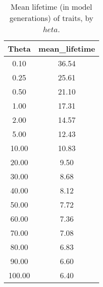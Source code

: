 \begin{table}[ht]
\begin{ruledtabular}
\begin{tabular}{|c|c|}
  \hline
Theta & mean\_lifetime \\ 
  \hline
0.10 & 36.54 \\ 
  0.25 & 25.61 \\ 
  0.50 & 21.10 \\ 
  1.00 & 17.31 \\ 
  2.00 & 14.57 \\ 
  5.00 & 12.43 \\ 
  10.00 & 10.83 \\ 
  20.00 & 9.50 \\ 
  30.00 & 8.68 \\ 
  40.00 & 8.12 \\ 
  50.00 & 7.72 \\ 
  60.00 & 7.36 \\ 
  70.00 & 7.08 \\ 
  80.00 & 6.83 \\ 
  90.00 & 6.60 \\ 
  100.00 & 6.40 \\ 
   \hline
\end{tabular}
\caption{Mean lifetime (in model generations) of traits, by $	heta$.}
\label{tab:mean-trait-lifetime}
\end{ruledtabular}
\end{table}
